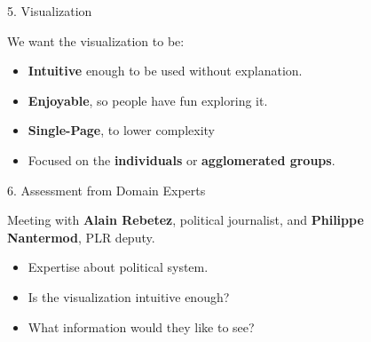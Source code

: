 \documentclass[final]{beamer}
\newlength{\sepwid}
\newlength{\onecolwid}
\newlength{\twocolwid}
\begin{document}
\begin{frame}[t]
\begin{columns}[t]
\begin{column}{\twocolwid}
\begin{columns}[t,totalwidth=\twocolwid]
\begin{column}{\onecolwid}
\end{column} %

\end{columns} %

\end{column} %

\begin{column}{\sepwid}\end{column} %

\begin{column}{\onecolwid} %


\begin{alertblock}{5. Visualization}

We want the visualization to be: 
\begin{itemize}
\item \textbf{Intuitive} enough to be used without explanation.
\item \textbf{Enjoyable}, so people have fun exploring it.
\item \textbf{Single-Page}, to lower complexity
\item Focused on the \textbf{individuals} or \textbf{agglomerated groups}.
\end{itemize}


\end{alertblock}


\begin{alertblock}{6. Assessment from Domain Experts}

Meeting with \textbf{Alain Rebetez}, political journalist, and \textbf{Philippe Nantermod}, PLR deputy.

\begin{itemize}
\item Expertise about political system.
\item Is the visualization intuitive enough?
\item What information would they like to see?
\end{itemize}




\end{alertblock}
\end{column}
\end{columns}
\end{frame}
\end{document}
